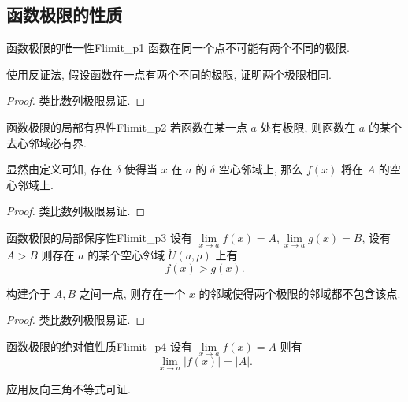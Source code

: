 \documentclass[cn,toc=twocol]{elegantbook}
\begin{document}
\subsection{函数极限的性质}

\begin{theorem}{函数极限的唯一性}{Flimit_p1}
函数在同一个点不可能有两个不同的极限.
\end{theorem}
\begin{idea*}
使用反证法, 假设函数在一点有两个不同的极限, 证明两个极限相同.
\end{idea*}

\begin{proof}
类比数列极限易证.
\end{proof}
\smallskip

\begin{theorem}{函数极限的局部有界性}{Flimit_p2}
若函数在某一点 $a$ 处有极限, 则函数在 $a$ 的某个去心邻域必有界.
\end{theorem}

\begin{idea*}
显然由定义可知, 存在 $\delta$ 使得当 $x$ 在 $a$ 的 $\delta$ 空心邻域上, 那么 $f(x)$ 将在 $A$ 的空心邻域上.
\end{idea*}

\begin{proof}
类比数列极限易证.
\end{proof}
\smallskip

\begin{theorem}{函数极限的局部保序性}{Flimit_p3}
设有 $\lim\limits_{x \to a} f(x) = A, \lim\limits_{x \to a} g(x) = B$, 设有 $A > B$ 则存在 $a$ 的某个空心邻域 $\mathring{U}(a,\rho)$ 上有
\[
	f(x) > g(x).
\]
\end{theorem}

\begin{idea*}
构建介于 $A, B$ 之间一点, 则存在一个 $x$ 的邻域使得两个极限的邻域都不包含该点.
\end{idea*}

\begin{proof}
类比数列极限易证.
\end{proof}
\smallskip

\begin{theorem}{函数极限的绝对值性质}{Flimit_p4}
设有 $\lim\limits_{x \to a} f(x) = A$ 则有
\[
	\lim\limits_{x \to a} \lvert f(x) \rvert = \lvert A \rvert.
\]
\end{theorem}

\begin{idea*}
应用反向三角不等式可证.
\end{idea*}
\end{document}
